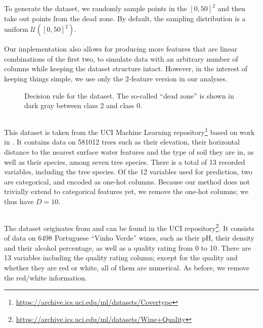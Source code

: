 \documentclass[../main.tex]{subfiles}
\begin{document}
To generate the dataset, we randomly sample points in the $[0, 50]^2$ and then take out points from the dead zone. By default, the sampling distribution is a uniform $\mathcal{U}([0, 50]^2)$.

Our implementation also allows for producing more features that are linear combinations of the first two, to simulate data with an arbitrary number of columns while keeping the dataset structure intact.
However, in the interest of keeping things simple, we use only the 2-feature version in our analyses.

\begin{figure}[h]
    \centering

\caption{Decision rule for the \CakeOnSea dataset. The so-called ``dead zone'' is shown in dark gray between class 2 and class 0.}
    \label{fig:cake_on_sea}
\end{figure}

\subsection{\ForestCover}

This dataset is taken from the UCI Machine Learning repository\footnote{\url{https://archive.ics.uci.edu/ml/datasets/Covertype}} \cite{duaUCI2019} based on work in \cite{blackardComparative1999}.
It contains data on 581012 trees such as their elevation, their horizontal distance to the nearest surface water features and the type of soil they are in, as well as their species, among seven tree species. There is a total of 13 recorded variables, including the tree species. Of the 12 variables used for prediction, two are categorical, and encoded as one-hot columns.
Because our method does not trivially extend to categorical features yet, we remove the one-hot columns; we thus have $D = 10$.

\subsection{\WineQuality}

The \WineQuality{} dataset originates from \cite{cortezModeling2009} and can be found in the UCI repository\footnote{\url{https://archive.ics.uci.edu/ml/datasets/Wine+Quality}}.
It consists of data on 6498 Portuguese ``Vinho Verde'' wines, such as their pH, their density and their alcohol percentage, as well as a quality rating from 0 to 10.
There are 13 variables including the quality rating column; except for the quality and whether they are red or white, all of them are numerical.
As before, we remove the red/white information.
\end{document}
